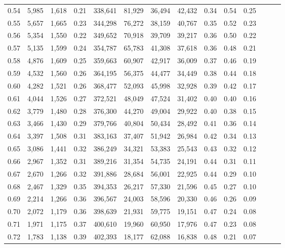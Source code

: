 \begin{tabular}{rrrrrrrrrrrrrr}
0.54 &  5,985 &  1,618 &  0.21 &  338,641 &   81,929 &  36,494 &  42,432 &  0.34 &  0.54 &      0.25 \\
0.55 &  5,657 &  1,665 &  0.23 &  344,298 &   76,272 &  38,159 &  40,767 &  0.35 &  0.52 &      0.23 \\
0.56 &  5,354 &  1,550 &  0.22 &  349,652 &   70,918 &  39,709 &  39,217 &  0.36 &  0.50 &      0.22 \\
0.57 &  5,135 &  1,599 &  0.24 &  354,787 &   65,783 &  41,308 &  37,618 &  0.36 &  0.48 &      0.21 \\
0.58 &  4,876 &  1,609 &  0.25 &  359,663 &   60,907 &  42,917 &  36,009 &  0.37 &  0.46 &      0.19 \\
0.59 &  4,532 &  1,560 &  0.26 &  364,195 &   56,375 &  44,477 &  34,449 &  0.38 &  0.44 &      0.18 \\
0.60 &  4,282 &  1,521 &  0.26 &  368,477 &   52,093 &  45,998 &  32,928 &  0.39 &  0.42 &      0.17 \\
0.61 &  4,044 &  1,526 &  0.27 &  372,521 &   48,049 &  47,524 &  31,402 &  0.40 &  0.40 &      0.16 \\
0.62 &  3,779 &  1,480 &  0.28 &  376,300 &   44,270 &  49,004 &  29,922 &  0.40 &  0.38 &      0.15 \\
0.63 &  3,466 &  1,430 &  0.29 &  379,766 &   40,804 &  50,434 &  28,492 &  0.41 &  0.36 &      0.14 \\
0.64 &  3,397 &  1,508 &  0.31 &  383,163 &   37,407 &  51,942 &  26,984 &  0.42 &  0.34 &      0.13 \\
0.65 &  3,086 &  1,441 &  0.32 &  386,249 &   34,321 &  53,383 &  25,543 &  0.43 &  0.32 &      0.12 \\
0.66 &  2,967 &  1,352 &  0.31 &  389,216 &   31,354 &  54,735 &  24,191 &  0.44 &  0.31 &      0.11 \\
0.67 &  2,670 &  1,266 &  0.32 &  391,886 &   28,684 &  56,001 &  22,925 &  0.44 &  0.29 &      0.10 \\
0.68 &  2,467 &  1,329 &  0.35 &  394,353 &   26,217 &  57,330 &  21,596 &  0.45 &  0.27 &      0.10 \\
0.69 &  2,214 &  1,266 &  0.36 &  396,567 &   24,003 &  58,596 &  20,330 &  0.46 &  0.26 &      0.09 \\
0.70 &  2,072 &  1,179 &  0.36 &  398,639 &   21,931 &  59,775 &  19,151 &  0.47 &  0.24 &      0.08 \\
0.71 &  1,971 &  1,175 &  0.37 &  400,610 &   19,960 &  60,950 &  17,976 &  0.47 &  0.23 &      0.08 \\
0.72 &  1,783 &  1,138 &  0.39 &  402,393 &   18,177 &  62,088 &  16,838 &  0.48 &  0.21 &      0.07 \\

\end{tabular}
